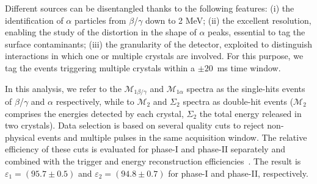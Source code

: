 \documentclass[%
reprint,
superscriptaddress,
altaffilletter,
showpacs,
showkeys,
amsmath, amssymb, aps,prl, floatfix
]{revtex4-1}
\newcommand{\mspeconea}{$\mathcal{M}_{1\alpha}$\xspace}
\newcommand{\mspeconeb}{$\mathcal{M}_{1\beta/\gamma}$\xspace}
\newcommand{\mspectwo}{$\mathcal{M}_2$\xspace}
\newcommand{\summspectwo}{$\Sigma_2$\xspace}
\newcommand{\phone}{phase-I\xspace}
\newcommand{\phtwo}{phase-II\xspace}
\begin{document}
Different sources can be disentangled thanks to the following features: (i) the identification of $\alpha$ particles from $\beta$/$\gamma$ down to 2 MeV; (ii) the excellent resolution, enabling the study of the distortion in the shape of $\alpha$ peaks, essential to tag the surface contaminants; (iii) the granularity of the detector, exploited to distinguish interactions in which one or multiple crystals are involved. For this purpose, we tag the events triggering multiple crystals within a $\pm20$~ms time window.

In this analysis, we refer to the \mspeconeb and \mspeconea spectra as the single-hits events of $\beta$/$\gamma$ and $\alpha$ respectively, while to \mspectwo and \summspectwo spectra as double-hit events (\mspectwo comprises the energies detected by each crystal, \summspectwo the total energy released in two crystals). Data selection is based on several quality cuts to reject non-physical events and multiple pulses in the same acquisition window. 
The relative efficiency of these cuts is evaluated for \phone and \phtwo separately and combined with the trigger and energy reconstruction efficiencies~\cite{Azzolini:2019nmi}. 
The result is $\varepsilon_{1}=(95.7 \pm 0.5)$ and $\varepsilon_{2}=(94.8 \pm 0.7)$ for \phone and \phtwo, respectively.
\end{document}
